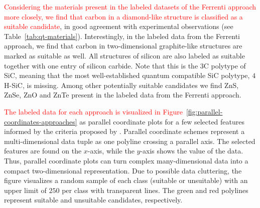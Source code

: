 \documentclass[superscriptaddress,unsortedaddress,
 amsmath,amssymb,
 aps,
]{revtex4-2}
\newcommand{\mrk}[1]{\textcolor{red}{#1}}
\begin{document}
 
\mrk{Considering the materials present in the labeled datasets of the Ferrenti approach more closely, we find that carbon in a diamond-like structure is classified as a suitable candidate}, in good agreement with experimental observations (see Table~\ref{tab:qt-materials}). Interestingly, in the labeled data from the Ferrenti approach, we find that carbon in two-dimensional graphite-like structures are marked as suitable as well. All structures of silicon are also labeled as suitable together with one entry of silicon carbide. Note that this is the $3$C polytype of SiC, meaning that the most well-established quantum compatible SiC polytype, $4$H-SiC, is missing. 
Among other potentially suitable candidates we find ZnS, ZnSe, ZnO and ZnTe present in the labeled data from the Ferrenti approach.  

\mrk{The labeled data for each approach is visualized in Figure~\ref{fig:parallel-coordinates-approaches}} as parallel coordinate plots for a few selected features informed by the criteria proposed by \citeauthor{Weber2010} \cite{Weber2010}. Parallel coordinate schemes  \cite{Inselberga1990, Inselberg1985} represent a multi-dimensional data tuple as one polyline crossing a parallel axis. The selected features are found on the $x$-axis, while the $y$-axis shows the value of the data. Thus, parallel coordinate plots can turn complex many-dimensional data into a compact  two-dimensional representation. Due to possible data cluttering, the figure visualizes a random sample of each class (suitable or unsuitable) with an upper limit of $250$ per class with transparent lines. The green and red polylines represent suitable and unsuitable candidates, respectively. 
\end{document}
